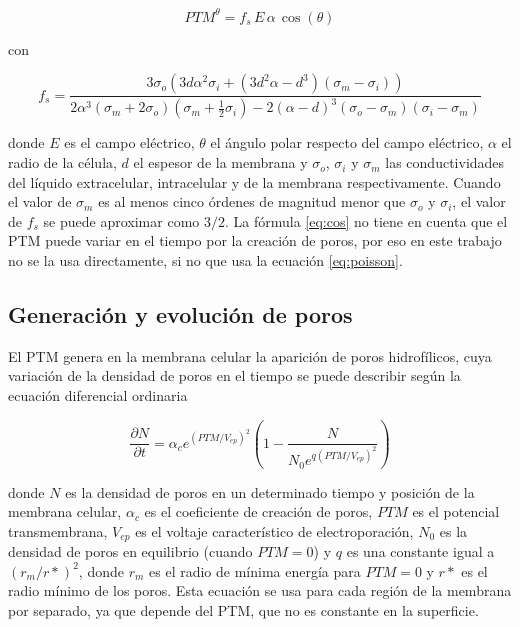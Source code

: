 \begin{equation} \label{eq:cos}
	 PTM^{\theta} = f_s\, E\, \alpha\, \cos (\theta) 
\end{equation}

con

\begin{equation} \label{eq:lambda}
    f_s = \frac{3\sigma_o \left( 3 d \alpha^2 \sigma_i + \left( 3 d^2 \alpha - d^3 \right) \left(\sigma_m - \sigma_i \right) \right)}{2 \alpha^3 \left( \sigma_m + 2 \sigma_o \right) \left(\sigma_m + \frac{1}{2} \sigma_i \right) - 2 \left(\alpha - d \right)^3 \left(\sigma_o - \sigma_m \right) \left( \sigma_i - \sigma_m \right)}
\end{equation}

donde $E$ es el campo eléctrico, $\theta$ el ángulo polar respecto del campo eléctrico, $\alpha$ el radio de la célula, $d$ el espesor de la membrana y $\sigma_o$, $\sigma_i$ y $\sigma_m$ las conductividades del líquido extracelular, intracelular y de la membrana respectivamente. Cuando el valor de $\sigma_m$ es al menos cinco órdenes de magnitud menor que $\sigma_o$ y $\sigma_i$, el valor de $f_s$ se puede aproximar como $3/2$\cite{c5-puchiar}. La fórmula \ref{eq:cos} no tiene en cuenta que el PTM puede variar en el tiempo por la creación de poros, por eso en este trabajo no se la usa directamente, si no que usa la ecuación \ref{eq:poisson}.

\subsection*{Generación y evolución de poros}
El PTM genera en la membrana celular la aparición de poros hidrofílicos, cuya variación de la densidad de poros en el tiempo se puede describir según la ecuación diferencial ordinaria \cite{krass-viejo}

\begin{equation} \label{eq:poros-crea}
	\frac{\partial N}{\partial t} = \alpha_c e^{(PTM/V_{ep})^2} \left( 1 - \frac{N}{N_0 e^{q \left(PTM/V_{ep} \right) ^2}} \right)
\end{equation}

donde $N$ es la densidad de poros en un determinado tiempo y posición de la membrana celular, $\alpha_c$ es el coeficiente de creación de poros, $PTM$ es el potencial transmembrana, $V_{ep}$ es el voltaje característico de electroporación, $N_0$ es la densidad de poros en equilibrio (cuando $PTM = 0$) y $q$ es una constante igual a $(r_m / r*)^2$, donde $r_m$ es el radio de mínima energía para $PTM = 0$ y $r*$ es el radio mínimo de los poros. Esta ecuación se usa para cada región de la membrana por separado, ya que depende del PTM, que no es constante en la superficie. 

